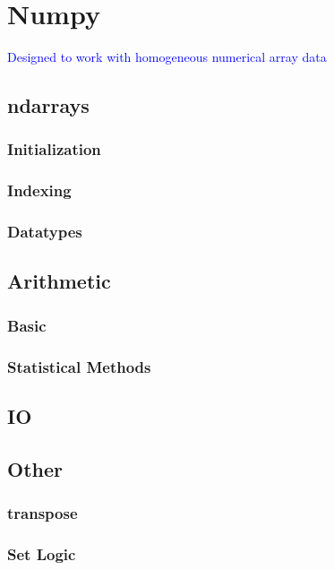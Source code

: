 \section{Numpy}

\textcolor{blue}{Designed to work with homogeneous numerical array data}

\subsection{ndarrays}

\subsubsection{Initialization}

\subsubsection{Indexing}

\subsubsection{Datatypes}

\subsection{Arithmetic}

\subsubsection{Basic}

\subsubsection{Statistical Methods}

\subsection{IO}



\subsection{Other}

\subsubsection{transpose}

\subsubsection{Set Logic}




